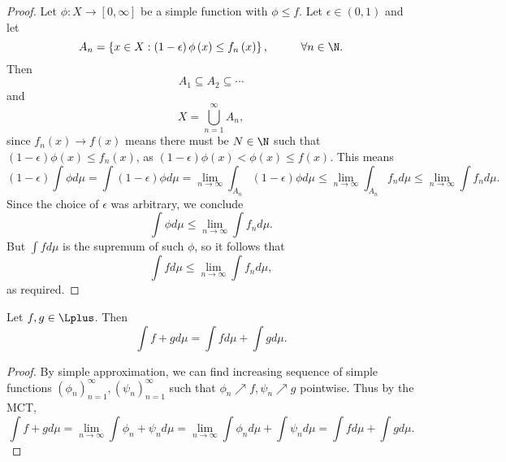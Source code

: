 \documentclass[pmath451]{subfiles}
\begin{document}
\begin{proof}
        Let $\phi:X\to\left[ 0,\infty \right]$ be a simple function with $\phi\leq f$. Let $\epsilon\in\left( 0,1 \right)$ and let
        \begin{equation*}
            A_n = \left\lbrace x\in X: \left( 1-\epsilon \right)\phi\left( x \right)\leq f_n\left( x \right) \right\rbrace,\hspace{1cm}\forall n\in\N.
        \end{equation*}
        Then
        \begin{equation*}
            A_1\subseteq A_2\subseteq \cdots
        \end{equation*}
        and
        \begin{equation*}
            X = \bigcup^{\infty}_{n=1}A_n,
        \end{equation*}
        since $f_n\left( x \right)\to f\left( x \right)$ means there must be $N\in\N$ such that $\left( 1-\epsilon \right)\phi\left( x \right) \leq f_n\left( x \right)$, as $\left( 1-\epsilon \right)\phi\left( x \right)<\phi\left( x \right)\leq f\left( x \right)$. This means
        \begin{equation*}
            \left( 1-\epsilon \right)\int\phi d\mu = \int\left( 1-\epsilon \right)\phi d\mu = \lim_{n\to\infty} \int_{A_n}\left( 1-\epsilon \right)\phi d\mu \leq \lim_{n\to\infty} \int_{A_n} f_nd\mu \leq \lim_{n\to\infty} \int f_nd\mu .
        \end{equation*}
        Since the choice of $\epsilon$ was arbitrary, we conclude
        \begin{equation*}
            \int\phi d\mu \leq \lim_{n\to\infty}\int f_nd\mu.
        \end{equation*}
        But $\int fd\mu$ is the supremum of such $\phi$, so it follows that
        \begin{equation*}
            \int fd\mu\leq \lim_{n\to\infty}\int f_nd\mu,
        \end{equation*}
        as required.
    \end{proof}
    
    \begin{prop}{}
        Let $f,g\in\Lplus$. Then
        \begin{equation*}
            \int f+gd\mu = \int fd\mu + \int gd\mu.
        \end{equation*}
    \end{prop}

    \begin{proof}
        By simple approximation, we can find increasing sequence of simple functions $\left( \phi_{n} \right)^{\infty}_{n=1}, \left( \psi_{n} \right)^{\infty}_{n=1}$ such that $\phi_n\nearrow f, \psi_n\nearrow g$ pointwise. Thus by the MCT,
        \begin{equation*}
            \int f+gd\mu = \lim_{n\to\infty} \int\phi_n+\psi_nd\mu = \lim_{n\to\infty} \int\phi_nd\mu + \int\psi_nd\mu = \int fd\mu + \int gd\mu.
        \end{equation*}
    \end{proof}
    
\end{document}
